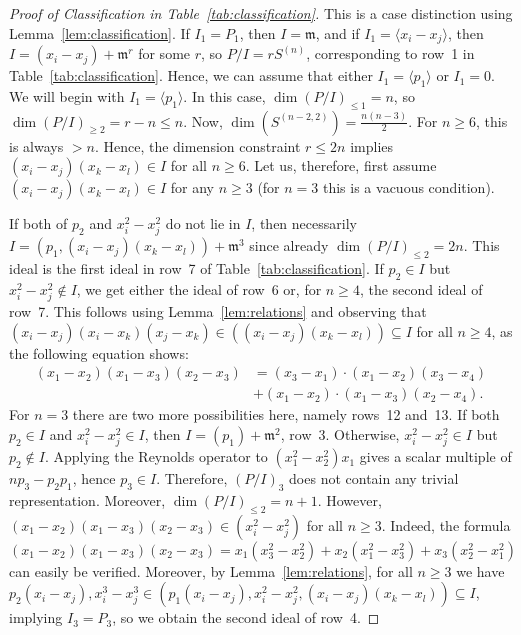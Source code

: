 \documentclass[11pt]{amsart}
\theoremstyle{definition}
\newcommand{\mm}{\mathfrak{m}}
\begin{document}
\begin{proof}[Proof of Classification in Table~\ref{tab:classification}]
    This is a case distinction using Lemma~\ref{lem:classification}. If $I_1 = P_1$, then $I = \mm$, and if $I_1 = \langle x_i-x_j \rangle$, then $I = (x_i-x_j) + \mm^r$ for some $r$, so $P/I = r S^{(n)}$, corresponding to row~1 in Table~\ref{tab:classification}. Hence, we can assume that either $I_1 = \langle p_1 \rangle$ or $I_1 = 0$.\\
    
    We will begin with $I_1 = \langle p_1 \rangle$.
    In this case, $\dim(P/I)_{\leq 1} = n$, so $\dim(P/I)_{\geq 2} = r-n \leq n$. Now, $\dim(S^{(n-2,2)}) = \frac{n(n-3)}{2}$. For $n \geq 6$, this is always $>n$. Hence, the dimension constraint $r \leq 2n$ implies $(x_i-x_j)(x_k-x_l) \in I$ for all $n \geq 6$. Let us, therefore, first assume $(x_i-x_j)(x_k-x_l) \in I$ for any $n \geq 3$ (for $n=3$ this is a vacuous condition).
    
    If both of $p_2$ and $x_i^2-x_j^2$ do not lie in $I$, then necessarily $I = (p_1,(x_i-x_j)(x_k-x_l)) + \mm^3$ since already $\dim(P/I)_{\leq 2} = 2n$. This ideal is the first ideal in row~7 of Table~\ref{tab:classification}. If $p_2 \in I$ but $x_i^2 - x_j^2 \not\in I$, we get either the ideal of row~6 or, for $n \geq 4$, the second ideal of row~7. This follows using Lemma~\ref{lem:relations} and observing that $(x_i-x_j)(x_i-x_k)(x_j-x_k) \in ((x_i-x_j)(x_k-x_l)) \subseteq I$ for all $n \geq 4$, as the following equation shows:
    \begin{align*}
        (x_1-x_2)(x_1-x_3)(x_2-x_3) &= (x_3 - x_1) \cdot (x_1-x_2)(x_3-x_4) \\ &+ (x_1-x_2) \cdot (x_1-x_3)(x_2-x_4).
    \end{align*}
    For $n=3$ there are two more possibilities here, namely rows~12 and~13.
    If both $p_2 \in I$ and $x_i^2 - x_j^2 \in I$, then $I = (p_1) + \mm^2$, row~3. Otherwise, $x_i^2 - x_j^2 \in I$ but $p_2 \not\in I$. Applying the Reynolds operator to $(x_1^2 - x_2^2)x_1$ gives a scalar multiple of $n p_3 - p_2p_1$, hence $p_3 \in I$. Therefore, $(P/I)_3$ does not contain any trivial representation. Moreover, $\dim(P/I)_{\leq 2} = n+1$. However, $(x_1-x_2)(x_1-x_3)(x_2-x_3) \in (x_i^2-x_j^2)$ for all $n \geq 3$. Indeed, the formula
    \begin{equation*}
        (x_1-x_2)(x_1-x_3)(x_2-x_3) = x_1(x_3^2-x_2^2) + x_2(x_1^2-x_3^2) + x_3(x_2^2-x_1^2)
    \end{equation*}
    can easily be verified. Moreover, by Lemma~\ref{lem:relations}, for all $n \geq 3$ we have $p_2(x_i-x_j), x_i^3-x_j^3 \in (p_1(x_i-x_j),x_i^2-x_j^2,(x_i-x_j)(x_k-x_l)) \subseteq I$, implying $I_3 = P_3$, so we obtain the second ideal of row~4.
    

\end{proof}
\end{document}
